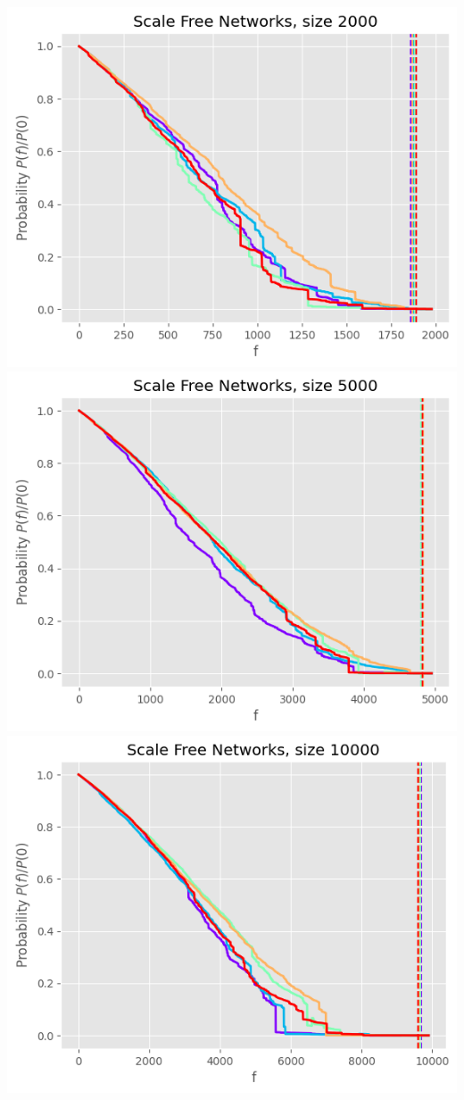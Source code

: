 \documentclass[
]{article}
\begin{document}
\includegraphics{./assets/scalefree_2000_random.png}
\includegraphics{./assets/scalefree_5000_random.png}
\includegraphics{./assets/scalefree_10000_random.png}
\end{document}
